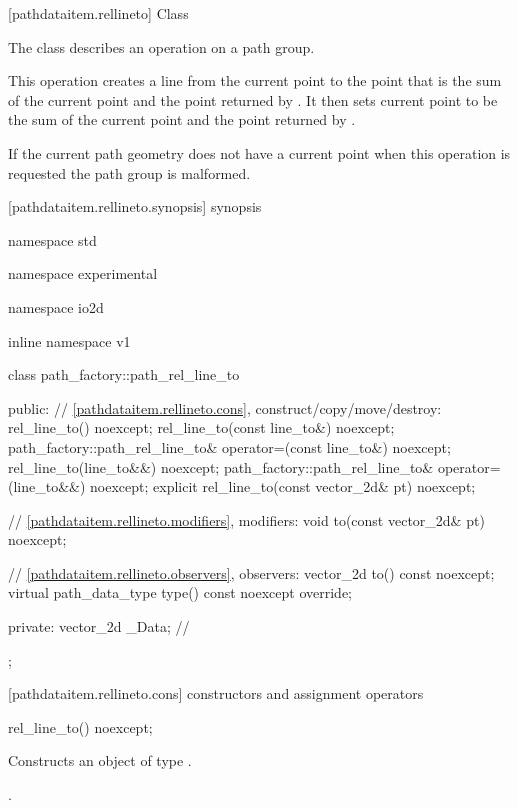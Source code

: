  [pathdataitem.rellineto] {Class }

\pnum
{}
The class  describes an operation on a path group.

\pnum
This operation creates a line from the current point to the point that is the sum of the current point and the point returned by . It then sets current point to be the sum of the current point and the point returned by .

\pnum
If the current path geometry does not have a current point when this operation is requested the path group is malformed.

 [pathdataitem.rellineto.synopsis] { synopsis}

\begin{codeblock}
namespace std { namespace experimental { namespace io2d { inline namespace v1 {
  class path_factory::path_rel_line_to {
  public:
    // \ref{pathdataitem.rellineto.cons}, construct/copy/move/destroy:
    rel_line_to() noexcept;
    rel_line_to(const line_to&) noexcept;
    path_factory::path_rel_line_to& operator=(const line_to&) noexcept;
    rel_line_to(line_to&&) noexcept;
    path_factory::path_rel_line_to& operator=(line_to&&) noexcept;
    explicit rel_line_to(const vector_2d& pt) noexcept;

    // \ref{pathdataitem.rellineto.modifiers}, modifiers:
    void to(const vector_2d& pt) noexcept;

    // \ref{pathdataitem.rellineto.observers}, observers:
    vector_2d to() const noexcept;
    virtual path_data_type type() const noexcept override;
    
  private:
    vector_2d _Data; // \expos
  };
} } } }
\end{codeblock}

 [pathdataitem.rellineto.cons] { constructors and assignment operators}

\begin{itemdecl}
    rel_line_to() noexcept;
\end{itemdecl}
\begin{itemdescr}
	\pnum
	\effects
	Constructs an object of type .
	
	\pnum
	\postconditions
	.
\end{itemdescr}

